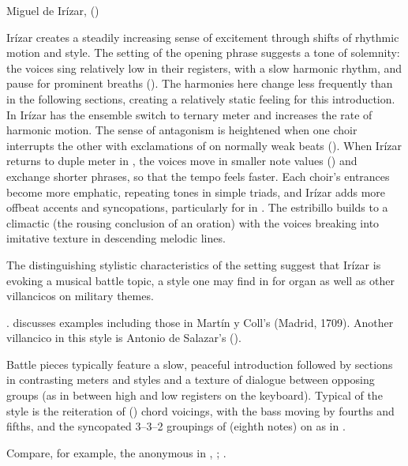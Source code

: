 
{Miguel de Irízar, 
()}

Irízar creates a steadily increasing sense of excitement through shifts of
rhythmic motion and style.
The setting of the opening phrase suggests a tone of solemnity: the voices sing
relatively low in their registers, with a slow harmonic rhythm, and pause for
prominent breaths ().
The harmonies here change less frequently than in the following sections,
creating a relatively static feeling for this introduction.
In  Irízar has the ensemble switch to ternary meter and increases
the rate of harmonic motion.
The sense of antagonism is heightened when one choir interrupts the other with
exclamations of  on normally weak beats ().
When Irízar returns to duple meter in , the voices move in smaller
note values () and exchange shorter phrases, so that the tempo
feels faster.
Each choir's entrances become more emphatic, repeating tones in simple triads,
and Irízar adds more offbeat accents and syncopations, particularly for
 in .
The estribillo builds to a climactic  (the rousing conclusion of
an oration) with the voices breaking into imitative texture in descending
melodic lines.


The distinguishing stylistic characteristics of the setting suggest that Irízar
is evoking a musical battle topic, a style one may find in  for
organ as well as other villancicos on military themes.%
\begin{Footnote}
    \Autocites
    []{Grove}
    [288--294]{Illari:Polychoral}.
    \Autocite{Sutton:IberianBatalla} discusses examples including those in
    Martín y Coll's  (Madrid, 1709).
    Another villancico in this style is Antonio de Salazar's  ().
\end{Footnote}
Battle pieces typically feature a slow, peaceful introduction followed by
sections in contrasting meters and styles and a texture of dialogue between
opposing groups (as in between high and low registers on the keyboard).  
Typical of the style is the reiteration of  () chord voicings, with the bass moving by fourths and fifths, and the
syncopated 3--3--2 groupings of  (eighth notes) on  as in .%
\begin{Footnote}
    Compare, for example, the anonymous  in ,
    ; \autocite{Araujo:Batalla}.  
\end{Footnote}

